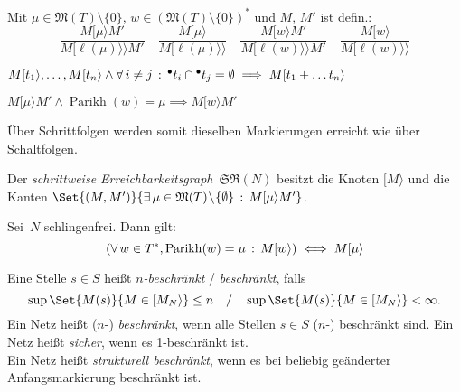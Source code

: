 \documentclass{cheat-sheet}
\newcommand{\preset}[1]{{}^\bullet{#1}} %
\newcommand{\activeTransition}[1]{[{#1}\rangle} %
\newcommand{\labelledTransition}[1]{[{#1}\rangle\rangle} %
\newcommand{\StepReachabilityGraph}{\mathfrak{SR}} %
\DeclareMathOperator{\Parikh}{Parikh} %
\newcommand{\inferrule}[2]{\frac{{#1}}{{#2}}} %
\newcommand{\Markings}{\mathfrak{M}} %
\begin{document}
\begin{defn}
  Mit $\mu \in \Markings(T) \setminus \{ 0 \}$, $w \in (\Markings(T) \setminus \{ 0 \})^{*}$ und $M$, $M'$ ist defin.:
  \[
    \inferrule
      {M \activeTransition{\mu} M'}
      {M \labelledTransition{\ell(\mu)} M'} \quad
    \inferrule
      {M \activeTransition{\mu}}
      {M \labelledTransition{\ell(\mu)}} \quad
    \inferrule
      {M \activeTransition{w} M'}
      {M \labelledTransition{\ell(w)} M'} \quad
    \inferrule
      {M \activeTransition{w}}
      {M \labelledTransition{\ell(w)}}
  \]
\end{defn}

\begin{lem}
  $M \activeTransition{t_1}, \ldots, M \activeTransition{t_n} \wedge \fa{i \neq j} \preset{t_i} \cap \preset{t_j} = \emptyset \implies M \activeTransition{t_1 + \ldots t_n}$
\end{lem}

\begin{lem}
  $M \activeTransition{\mu} M' \wedge \Parikh(w) = \mu \implies M \activeTransition{w} M'$
\end{lem}

\begin{bem}
  Über Schrittfolgen werden somit dieselben Markierungen erreicht wie über Schaltfolgen.
\end{bem}

\begin{defn}
  Der \emph{schrittweise Erreichbarkeitsgraph}~$\StepReachabilityGraph(N)$ besitzt die Knoten $\activeTransition{M}$ und die Kanten $\Set{(M, M')}{\ex{\mu \in \Markings(T) \!\setminus\! \{ \emptyset \}} M \activeTransition{\mu} M'}$.
\end{defn}

\begin{lem}
  Sei~$N$ schlingenfrei. Dann gilt:
  \[
    (\fa{w \in T^{*}, \Parikh(w) = \mu} M \activeTransition{w}) \iff M \activeTransition{\mu}
  \]
\end{lem}



\begin{defn}
  Eine Stelle $s \in S$ heißt \emph{$n$-beschränkt} / \emph{beschränkt}, falls
  \[
    \sup \Set{M(s)}{M \in \activeTransition{M_N}} \leq n
    \quad / \quad
    \sup \Set{M(s)}{M \in \activeTransition{M_N}} < \infty.
  \]
  Ein Netz heißt ($n$-) \textit{beschränkt}, wenn alle Stellen $s \in S$ ($n$-) beschränkt sind.
  Ein Netz heißt \emph{sicher}, wenn es 1-beschränkt ist. \\
  Ein Netz heißt \emph{strukturell beschränkt}, wenn es bei beliebig geänderter Anfangsmarkierung beschränkt ist.
\end{defn}
\end{document}
